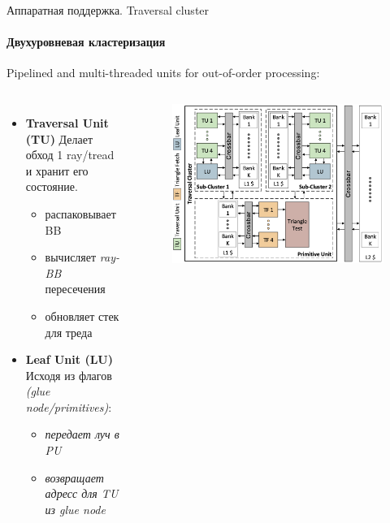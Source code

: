 \begin{frame}{Аппаратная поддержка. Traversal cluster}
    \framesubtitle{Двухуровневая кластеризация}
    Pipelined and multi-threaded units for out-of-order processing:
    \begin{columns}
        \begin{itemize}
            \item 
                \textbf{Traversal Unit (TU)}
                Делает обход 1 ray/tread и хранит его состояние.
                \begin{itemize}
                    \item 
                        распаковывает BB
                    \item 
                        вычисляет \textit{ray-BB} пересечения
                    \item 
                        обновляет стек для треда
                \end{itemize}
            \item 
                \textbf{Leaf Unit (LU)}
                Исходя из флагов
                \textit{(glue node/primitives)}:
                \begin{itemize}
                    \item 
                        \textit{передает луч в \textit{PU}}
                    \item 
                        \textit{возвращает адресс для \textit{TU} из glue node}
                \end{itemize}
        \end{itemize}
        \begin{figure}
            \includegraphics[keepaspectratio,
            width=\textwidth]{res/block_diagram.png}
        \end{figure}


\end{columns}
\end{frame}
